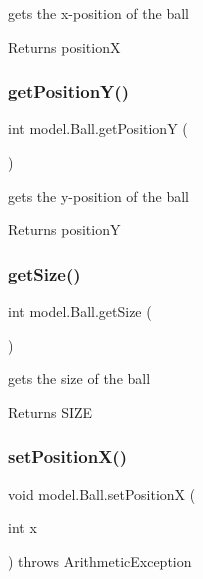 gets the x-\/position of the ball 

\begin{DoxyReturn}{Returns}
positionX 
\end{DoxyReturn}
\hypertarget{classmodel_1_1_ball_ae5509de430dc00bc02259294aa05c10d}{}\label{classmodel_1_1_ball_ae5509de430dc00bc02259294aa05c10d} 
\subsubsection{\texorpdfstring{get\+Position\+Y()}{getPositionY()}}
{\footnotesize\ttfamily int model.\+Ball.\+get\+PositionY (\begin{DoxyParamCaption}{ }\end{DoxyParamCaption})}



gets the y-\/position of the ball 

\begin{DoxyReturn}{Returns}
positionY 
\end{DoxyReturn}
\hypertarget{classmodel_1_1_ball_a46ca8051579a49ae750f965621534d5c}{}\label{classmodel_1_1_ball_a46ca8051579a49ae750f965621534d5c} 
\subsubsection{\texorpdfstring{get\+Size()}{getSize()}}
{\footnotesize\ttfamily int model.\+Ball.\+get\+Size (\begin{DoxyParamCaption}{ }\end{DoxyParamCaption})}



gets the size of the ball 

\begin{DoxyReturn}{Returns}
S\+I\+ZE 
\end{DoxyReturn}
\hypertarget{classmodel_1_1_ball_a14854352d44495abed0928ba16a0ac39}{}\label{classmodel_1_1_ball_a14854352d44495abed0928ba16a0ac39} 
\subsubsection{\texorpdfstring{set\+Position\+X()}{setPositionX()}}
{\footnotesize\ttfamily void model.\+Ball.\+set\+PositionX (\begin{DoxyParamCaption}\item[{int}]{x }\end{DoxyParamCaption}) throws Arithmetic\+Exception}



